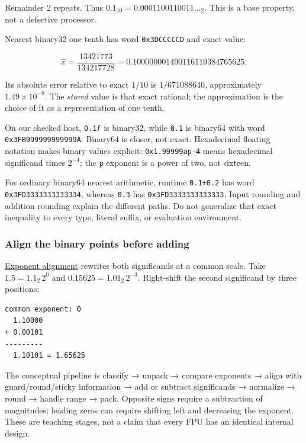 Remainder 2 repeats. Thus \(0.1_{10}=0.0001100110011\ldots_2\). This is a base property, not a defective processor.

Nearest binary32 one tenth has word \texttt{0x3DCCCCCD} and exact value:

\[
\widehat{x}=\frac{13421773}{134217728}
=0.100000001490116119384765625.
\]

Its absolute error relative to exact \(1/10\) is \(1/671088640\), approximately \(1.49\times10^{-9}\). The \emph{stored} value is that exact rational; the approximation is the choice of it as a representation of one tenth.

On our checked host, \texttt{0.1f} is binary32, while \texttt{0.1} is binary64 with word \texttt{0x3FB999999999999A}. Binary64 is closer, not exact. Hexadecimal floating notation makes binary values explicit: \texttt{0x1.99999ap-4} means hexadecimal significand times \(2^{-4}\); the \texttt{p} exponent is a power of two, not sixteen.

For ordinary binary64 nearest arithmetic, runtime \texttt{0.1+0.2} has word \texttt{0x3FD3333333333334}, whereas \texttt{0.3} has \texttt{0x3FD3333333333333}. Input rounding and addition rounding explain the different paths. Do not generalize that exact inequality to every type, literal suffix, or evaluation environment.

\subsubsection{Align the binary points before adding}\label{01-foundations-i-ch001-align-the-binary-points-before-adding}

\hypertarget{01-foundations-i-ch001-align-the-binary-points-before-adding}{}

\hyperref[appendix-a1b1b4580dfd]{Exponent alignment} rewrites both significands at a common scale. Take \(1.5=1.1_2\,2^0\) and \(0.15625=1.01_2\,2^{-3}\). Right-shift the second significand by three positions:

\begin{verbatim}
common exponent: 0
  1.10000
+ 0.00101
---------
  1.10101 = 1.65625
\end{verbatim}

The conceptual pipeline is classify → unpack → compare exponents → align with guard/round/sticky information → add or subtract significands → normalize → round → handle range → pack. Opposite signs require a subtraction of magnitudes; leading zeros can require shifting left and decreasing the exponent. These are teaching stages, not a claim that every FPU has an identical internal design.

